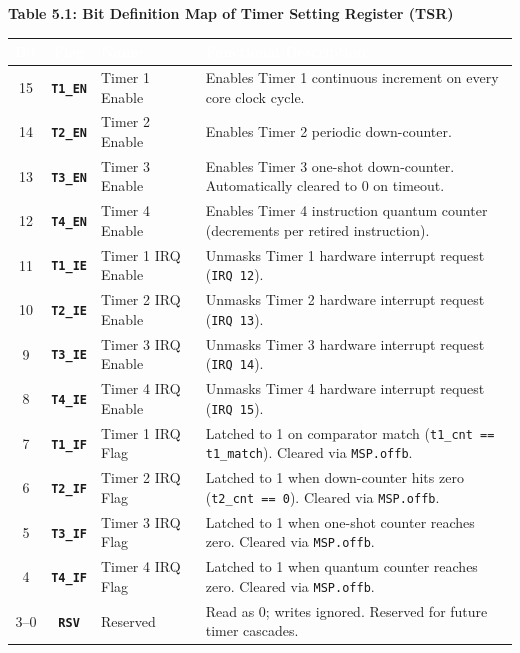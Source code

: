 \documentclass[11pt,a4paper]{article}
\begin{document}
\noindent\textbf{Table 5.1: Bit Definition Map of Timer Setting Register (TSR)}
\par\vspace{1.5mm}\noindent
{\small
\begin{tabularx}{\textwidth}{c c l X}
\toprule
\rowcolor{limslate}
\textcolor{white}{\textbf{Bit}} & \textcolor{white}{\textbf{Flag}} & \textcolor{white}{\textbf{Name}} & \textcolor{white}{\textbf{Functional Description}} \\
\midrule
\rowcolors{2}{limroweven}{white}
15 & \textbf{\texttt{T1\_EN}} & Timer 1 Enable & Enables Timer 1 continuous increment on every core clock cycle. \\
14 & \textbf{\texttt{T2\_EN}} & Timer 2 Enable & Enables Timer 2 periodic down-counter. \\
13 & \textbf{\texttt{T3\_EN}} & Timer 3 Enable & Enables Timer 3 one-shot down-counter. Automatically cleared to 0 on timeout. \\
12 & \textbf{\texttt{T4\_EN}} & Timer 4 Enable & Enables Timer 4 instruction quantum counter (decrements per retired instruction). \\
11 & \textbf{\texttt{T1\_IE}} & Timer 1 IRQ Enable & Unmasks Timer 1 hardware interrupt request (\texttt{IRQ 12}). \\
10 & \textbf{\texttt{T2\_IE}} & Timer 2 IRQ Enable & Unmasks Timer 2 hardware interrupt request (\texttt{IRQ 13}). \\
9  & \textbf{\texttt{T3\_IE}} & Timer 3 IRQ Enable & Unmasks Timer 3 hardware interrupt request (\texttt{IRQ 14}). \\
8  & \textbf{\texttt{T4\_IE}} & Timer 4 IRQ Enable & Unmasks Timer 4 hardware interrupt request (\texttt{IRQ 15}). \\
7  & \textbf{\texttt{T1\_IF}} & Timer 1 IRQ Flag & Latched to 1 on comparator match (\texttt{t1\_cnt == t1\_match}). Cleared via \texttt{MSP.offb}. \\
6  & \textbf{\texttt{T2\_IF}} & Timer 2 IRQ Flag & Latched to 1 when down-counter hits zero (\texttt{t2\_cnt == 0}). Cleared via \texttt{MSP.offb}. \\
5  & \textbf{\texttt{T3\_IF}} & Timer 3 IRQ Flag & Latched to 1 when one-shot counter reaches zero. Cleared via \texttt{MSP.offb}. \\
4  & \textbf{\texttt{T4\_IF}} & Timer 4 IRQ Flag & Latched to 1 when quantum counter reaches zero. Cleared via \texttt{MSP.offb}. \\
3--0 & \textbf{\texttt{RSV}} & Reserved & Read as 0; writes ignored. Reserved for future timer cascades. \\
\bottomrule
\end{tabularx}
}
\end{document}
